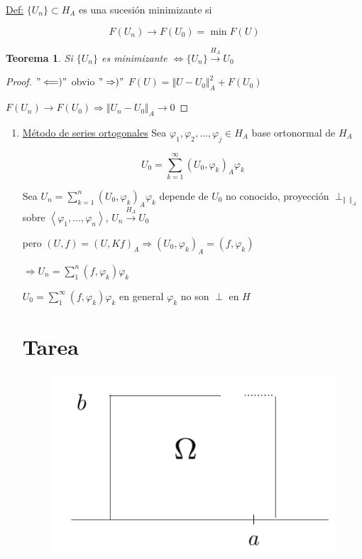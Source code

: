 \documentclass[a4paper,10pt]{book}
\newtheorem{theorem}{Teorema}
\begin{document}
\underline{Def:} $\{U_n\}\subset H_A$ es una sucesión minimizante si 

\[F(U_n)\rightarrow F(U_0) = \min F(U) \]

\begin{theorem}
    Si $\{ U_n\} $ es minimizante  $\Leftrightarrow \{ U_n\} \overset{H_A}{\rightarrow} U_0 $
\end{theorem}

\begin{proof}
    $"\Longleftarrow)"$ obvio
    $"\Rightarrow)"$ $F(U) = \Vert U- U_0\Vert_A^2 + F(U_0)$

    $F(U_n) \rightarrow F(U_0) \Rightarrow \Vert U_n-U_0\Vert_A \rightarrow 0$
    
\end{proof}

\begin{enumerate}
    \item \underline{Método de series ortogonales} 
    Sea $\varphi_1,\varphi_2, \ldots, \varphi_j \in H_A$ base ortonormal de $H_A$

    \[U_0= \sum\limits_{k=1}^\infty (U_0,\varphi_k)_A \varphi_k \]

    Sea $U_n = \sum_{k=1}^n (U_0 ,\varphi_k)_A \varphi_k $   depende de $U_0$ no conocido, proyección $\perp_{\Vert \;\;\Vert_A }$ sobre
    $\left< \varphi_1,\ldots,\varphi_n\right>$, $U_n\overset{H_A}{\rightarrow} U_0 $ 

    pero $(U,f)= (U, Kf)_A \Rightarrow (U_0,\varphi_k)_A = (f,\varphi_k)$

    $\Rightarrow U_n= \sum\limits_1^n (f,\varphi_k) \varphi_k$

    $U_0 = \sum\limits_1^\infty (f,\varphi_k)\varphi_k $ en general $\varphi_k$ no son $\perp$ en $H$

\section{Tarea}
\begin{figure}[H]
    \centering
    \includegraphics[width=0.5\linewidth]{Screen Shot 2024-03-14 at 18.49.42.png}
    \caption{}
    \label{fig:6}
\end{figure}


\end{enumerate}
\end{document}
